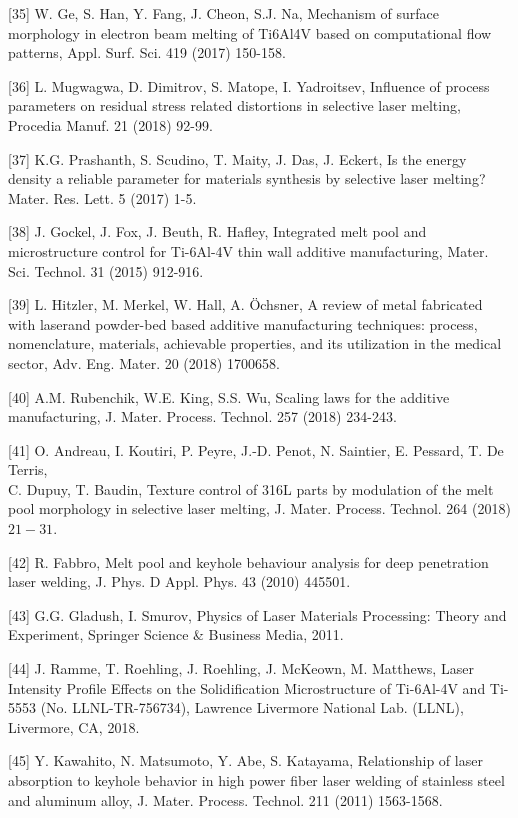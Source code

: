 \documentclass[10pt]{article}
\begin{document}
[35] W. Ge, S. Han, Y. Fang, J. Cheon, S.J. Na, Mechanism of surface morphology in electron beam melting of Ti6Al4V based on computational flow patterns, Appl. Surf. Sci. 419 (2017) 150-158.

[36] L. Mugwagwa, D. Dimitrov, S. Matope, I. Yadroitsev, Influence of process parameters on residual stress related distortions in selective laser melting, Procedia Manuf. 21 (2018) 92-99.

[37] K.G. Prashanth, S. Scudino, T. Maity, J. Das, J. Eckert, Is the energy density a reliable parameter for materials synthesis by selective laser melting? Mater. Res. Lett. 5 (2017) 1-5.

[38] J. Gockel, J. Fox, J. Beuth, R. Hafley, Integrated melt pool and microstructure control for Ti-6Al-4V thin wall additive manufacturing, Mater. Sci. Technol. 31 (2015) 912-916.

[39] L. Hitzler, M. Merkel, W. Hall, A. Öchsner, A review of metal fabricated with laserand powder-bed based additive manufacturing techniques: process, nomenclature, materials, achievable properties, and its utilization in the medical sector, Adv. Eng. Mater. 20 (2018) 1700658.

[40] A.M. Rubenchik, W.E. King, S.S. Wu, Scaling laws for the additive manufacturing, J. Mater. Process. Technol. 257 (2018) 234-243.

[41] O. Andreau, I. Koutiri, P. Peyre, J.-D. Penot, N. Saintier, E. Pessard, T. De Terris,\\
C. Dupuy, T. Baudin, Texture control of 316L parts by modulation of the melt pool morphology in selective laser melting, J. Mater. Process. Technol. 264 (2018) $21-31$.

[42] R. Fabbro, Melt pool and keyhole behaviour analysis for deep penetration laser welding, J. Phys. D Appl. Phys. 43 (2010) 445501.

[43] G.G. Gladush, I. Smurov, Physics of Laser Materials Processing: Theory and Experiment, Springer Science \& Business Media, 2011.

[44] J. Ramme, T. Roehling, J. Roehling, J. McKeown, M. Matthews, Laser Intensity Profile Effects on the Solidification Microstructure of Ti-6Al-4V and Ti-5553 (No. LLNL-TR-756734), Lawrence Livermore National Lab. (LLNL), Livermore, CA, 2018.

[45] Y. Kawahito, N. Matsumoto, Y. Abe, S. Katayama, Relationship of laser absorption to keyhole behavior in high power fiber laser welding of stainless steel and aluminum alloy, J. Mater. Process. Technol. 211 (2011) 1563-1568.
\end{document}
